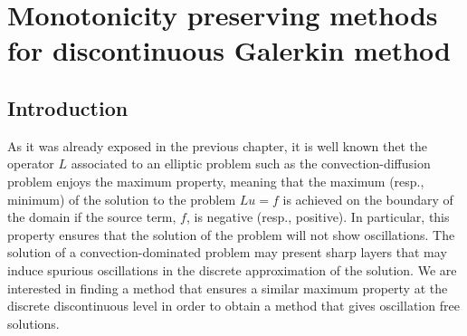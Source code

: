 \chapter{Monotonicity preserving methods for discontinuous Galerkin method}
\label{chap-paper2}

\section{Introduction}

As it was already exposed in the previous chapter, it is well known thet the operator $L$ associated to an elliptic problem such as the convection-diffusion problem enjoys the maximum property, meaning that the maximum (resp., minimum) of the solution to the problem $Lu=f$ is achieved on the boundary of the domain if the source term, $f$, is negative (resp., positive). 
In particular, this property ensures that the solution of the problem will not show oscillations. The solution of a convection-dominated problem may present sharp layers that may induce spurious oscillations in the discrete approximation of the solution. We are interested in finding a method that ensures a similar maximum property at the discrete discontinuous level in order to obtain a method that gives oscillation free solutions.

